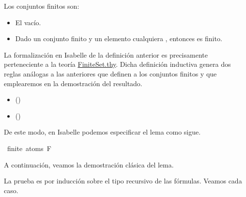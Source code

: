 \begin{isabellebody}
\begin{isamarkuptext}
  \begin{definicion}
    Los conjuntos finitos son:
      \begin{itemize}
        \item El vacío.
        \item Dado un conjunto finito  y un elemento cualquiera , 
          entonces  es finito.
      \end{itemize}
  \end{definicion}

  La formalización en Isabelle de la definición anterior es precisamente 
   perteneciente a la teoría 
  \href{https://n9.cl/x86r}{FiniteSet.thy}. Dicha definición inductiva
  genera dos reglas análogas a las anteriores que definen a los 
  conjuntos finitos y que emplearemos en la demostración del resultado.

  \begin{itemize}
    \item[]  
      \hfill ()
  \end{itemize}

  \begin{itemize}
    \item[]  
      \hfill ()
  \end{itemize}

  De este modo, en Isabelle podemos especificar el lema como sigue.%
\end{isamarkuptext}\isamarkuptrue%
\isamarkupfalse%
\ {\isachardoublequoteopen}finite\ {\isacharparenleft}atoms\ F{\isacharparenright}{\isachardoublequoteclose}\isanewline
%
\isadelimproof
\ \ %
\endisadelimproof
%
\isatagproof
{}\isamarkupfalse%
%
\endisatagproof
{\isafoldproof}%
%
\isadelimproof
%
\endisadelimproof
%
\begin{isamarkuptext}%
A continuación, veamos la demostración clásica del lema. 

  \begin{demostracion}
  La prueba es por inducción sobre el tipo recursivo de las fórmulas. 
  Veamos cada caso.
  

\end{demostracion}
\end{isamarkuptext}
\end{isabellebody}
